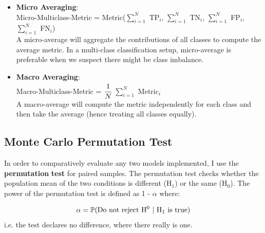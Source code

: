     \begin{itemize}
        \item \textbf{Micro Averaging}: \\
            Micro-Multiclass-Metric = Metric($\sum_{i=1}^{N}$ TP$_i$, $\sum_{i=1}^{N}$ TN$_i$, $\sum_{i=1}^{N}$ FP$_i$, $\sum_{i=1}^{N}$ FN$_i$) \\
             A micro-average will aggregate the contributions of all classes to compute the average metric. In a multi-class classification setup, micro-average is preferable when we suspect there might be class imbalance.
            
        \item \textbf{Macro Averaging}: \\
            Macro-Multiclass-Metric = $\cfrac{1}{N}$ $\sum_{i=1}^{N}$ Metric$_i$ \\
            A macro-average will compute the metric independently for each class and then take the average (hence treating all classes equally).
    \end{itemize}
    
    
    
    \subsection{Monte Carlo Permutation Test}
    
    In order to comparatively evaluate any two models implemented, I use the \textbf{permutation} \textbf{test} for paired samples. The permutation test checks whether the population mean of the two conditions is different (H$_1$) or the same (H$_0$). The power of the permutation test is defined as 1 - $\alpha$ where: 
    
    \begin{equation}
        \centering
        \alpha = \mathbb{P}(\text{Do not reject H$^0$ | H$_1$ is true}) \newline
    \end{equation}    
    i.e. the test declares no difference, where there really is one. \\
    
